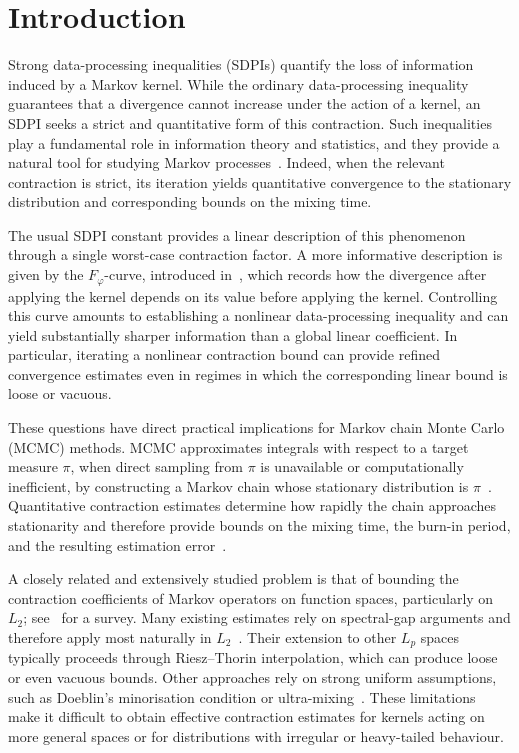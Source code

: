 \documentclass[11pt]{article}
\theoremstyle{plain}
\theoremstyle{remark}
\begin{document}
\section{Introduction}
Strong data-processing inequalities (SDPIs) quantify the loss of information induced by a Markov kernel. While the ordinary data-processing inequality guarantees that a divergence cannot increase under the action of a kernel, an SDPI seeks a strict and quantitative form of this contraction. Such inequalities play a fundamental role in information theory and statistics, and they provide a natural tool for studying Markov processes~\cite{sdpiRaginsky, contractionInputConstraint}. Indeed, when the relevant contraction is strict, its iteration yields quantitative convergence to the stationary distribution and corresponding bounds on the mixing time.

The usual SDPI constant provides a linear description of this phenomenon through a single worst-case contraction factor. A more informative description is given by the $F_\varphi$-curve, introduced in~\cite{contractionInputConstraint}, which records how the divergence after applying the kernel depends on its value before applying the kernel. Controlling this curve amounts to establishing a nonlinear data-processing inequality and can yield substantially sharper information than a global linear coefficient. In particular, iterating a nonlinear contraction bound can provide refined convergence estimates even in regimes in which the corresponding linear bound is loose or vacuous.

These questions have direct practical implications for Markov chain Monte Carlo (MCMC) methods. MCMC approximates integrals with respect to a target measure $\pi$, when direct sampling from $\pi$ is unavailable or computationally inefficient, by constructing a Markov chain whose stationary distribution is $\pi$~\cite{mcmc92,gilks1995markov,mcmcThesis}. Quantitative contraction estimates determine how rapidly the chain approaches stationarity and therefore provide bounds on the mixing time, the burn-in period, and the resulting estimation error~\cite{mcmc92,gilks1995markov,mcmcThesis}.

A closely related and extensively studied problem is that of bounding the contraction coefficients of Markov operators on function spaces, particularly on $L_2$; see~\cite{Roberts_2004} for a survey. Many existing estimates rely on spectral-gap arguments and therefore apply most naturally in $L_2$~\cite{mcmcThesis,dependentViaStatAndChange}. Their extension to other $L_p$ spaces typically proceeds through Riesz--Thorin interpolation, which can produce loose or even vacuous bounds. Other approaches rely on strong uniform assumptions, such as Doeblin's minorisation condition or ultra-mixing~\cite{contractionLedoux,hiddenMarkovModels,sdpiRaginsky}. These limitations make it difficult to obtain effective contraction estimates for kernels acting on more general spaces or for distributions with irregular or heavy-tailed behaviour.
\end{document}
